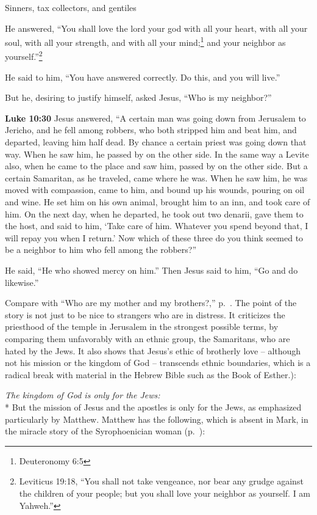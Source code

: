 \documentclass[10pt,twoside]{article} %
\newcommand{\doimage}[2]{\texttt{[image: \#2]}\label{fig:#2}}
\newcommand{\figbasic}[4]{ %
    \ifthenelse{\isodd{\pageref{fig:#2}}}{}{\hfill}
    \ifstrempty{#3}{
      \doimage{#1}{#2}
    }{
      \makebox{\doimage{#1}{#2} \\ #3}
    }
    \ifthenelse{\isodd{\pageref{fig:#2}}}{\hfill}{}
    \par
}
\newcommand{\fig}[2][0.4]{
  \figbasic{#1}{#2}{}{}
}
\newcommand{\quotesize}{\normalsize{}}
\newcommand{\comm}[1]{\begingroup \color{black!50} #1\endgroup}
\newenvironment{quotetext}{\begingroup\quotesize}{\endgroup}
\newcommand{\intex}[1]{\index[texts]{#1}}
\newcommand{\reftex}[1]{#1\intex{#1}}
\newcommand{\bible}[2]{\begin{quotetext}\textbf{#1}\intex{#1} #2\end{quotetext}}
\newcommand{\luke}[2]{\bible{Luke #1}{#2}}
\newcommand{\subhead}[1]{\emph{#1}\\*}
\begin{document}
\begin{section}{Sinners, tax collectors, and gentiles}
{  He answered, ``You shall love the lord your god with all your heart,
with all your soul, with all your strength, and with all your mind;\footnote{\reftex{Deuteronomy 6:5}}
 and your neighbor as yourself.''\footnote{\reftex{Leviticus 19:18}, ``You shall not take vengeance, nor bear any grudge against the children of your people; but you shall love your neighbor as yourself. I am Yahweh.''}

  He said to him, ``You have answered correctly. Do this, and you will live.''

  But he, desiring to justify himself, asked Jesus, ``Who is my neighbor?''
}

\fig[1]{good-samaritan}


\luke{10:30}{
  Jesus answered, ``A certain man was going down from Jerusalem to Jericho, and he fell among robbers, who both stripped him and beat him, and departed, leaving him half dead.    By chance a certain priest was going down that way. When he saw him, he passed by on the other side.    In the same way a Levite also, when he came to the place and saw him, passed by on the other side.    But a certain Samaritan, as he traveled, came where he was. When he saw him, he was moved with compassion,    came to him, and bound up his wounds, pouring on oil and wine. He set him on his own animal, brought him to an inn, and took care of him.    On the next day, when he departed, he took out two denarii, gave them to the host, and said to him, `Take care of him. Whatever you spend beyond that, I will repay you when I return.'    Now which of these three do you think seemed to be a neighbor to him who fell among the robbers?''

  He said, ``He who showed mercy on him.''
Then Jesus said to him, ``Go and do likewise.'' 
}

\comm{Compare with ``Who are my mother and my brothers?,'' p.~\pageref{who-are-my-mother-and-my-brothers}.
The point of the story is not just to be nice to strangers who are in distress.
It criticizes the priesthood of the temple in Jerusalem in the strongest possible terms, by comparing them
unfavorably with an ethnic group, the Samaritans, who are hated by the Jews. It also shows that Jesus's ethic
of brotherly love -- although not his mission or the kingdom of God --
transcends ethnic boundaries, which is a radical break with material in the Hebrew Bible
such as the Book of Esther.):
}\label{gentile-evangelists-disagree}

\subhead{The kingdom of God is only for the Jews:}
\comm{
But the mission of Jesus and the apostles is only for the Jews, as emphasized particularly by Matthew.
Matthew has the following, which is absent in Mark, in the
miracle story of the Syrophoenician woman (p.~\pageref{canaanite-woman}):
}


\end{section}
\end{document}
